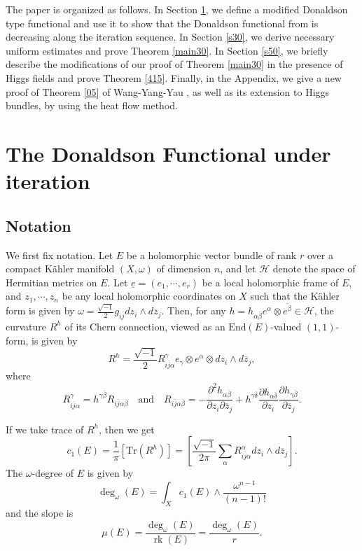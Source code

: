 \documentclass[11pt]{amsart}
\numberwithin{equation}{section}
\theoremstyle{remark}
\renewcommand{\bar}{\overline}
\newcommand{\pa}{\partial}
\newcommand{\ka}{K\"ahler }
\newcommand{\lb}{\left (}
\newcommand{\rb}{\right )}
\newcommand{\lsb}{\left [}
\newcommand{\rsb}{\right ]}
\newcommand{\ga}{\alpha}
\newcommand{\ii}{\sqrt{-1}}
\newcommand{\tr}{\text{Tr}}
\newcommand{\ud}{\underline}
\newcommand{\End}{\text{End}}
\begin{document}
The paper is organized as follows. In Section \ref{s20}, we define a modified Donaldson type functional and use it to show that the Donaldson functional from \cite{sd1} is decreasing along the iteration sequence. In Section \ref{s30}, we derive necessary uniform estimates and prove Theorem \ref{main30}. In Section \ref{s50}, we briefly describe the modifications of our proof of Theorem \ref{main30} in the presence of Higgs fields and prove Theorem \ref{415}. Finally, in the Appendix,  we give a new proof of Theorem \ref{05} of Wang-Yang-Yau \cite{WYY3}, as well as its extension to Higgs bundles, by using the heat flow method.



\section{The Donaldson Functional under iteration}\label{s20}

\subsection{Notation}
We first fix notation. Let $E$ be a holomorphic vector bundle of rank $r$ over a compact \ka manifold $(X,\omega)$ of dimension $n$, and let $\mathcal H$ denote the space of Hermitian metrics on $E$.  Let $\ud{e}=\lb e_1,\cdots,e_r\rb$ be a local holomorphic frame of $E$, and $z_1,\cdots,z_n$ be any local holomorphic coordinates on $X$ such that the \ka form is given by $\omega=\frac{\ii}{2}g_{i\bar j}dz_i\wedge d\bar z_j$.
Then, for any $h=h_{\alpha\bar{\beta}}e^\alpha\otimes \bar{e^{\beta}}\in\mathcal H$, the curvature $R^h$ of its Chern connection, viewed as an $\End(E)$-valued $(1,1)$-form, is given by
\[
R^h=\frac{\ii}{2}R_{i\bar j\alpha}^\gamma e_\gamma\otimes e^\alpha\otimes dz_i\wedge d\bar z_j,
\]
where
\[ R_{i\bar j\alpha}^\gamma = h^{\gamma\bar\beta}R_{i\bar j\alpha\bar\beta} \quad \text{and} \quad  R_{i\bar j\alpha\bar\beta}=-\frac{\pa^2 h_{\alpha\bar\beta}}{\pa z_i\pa\bar z_j}+ h^{\gamma\bar\delta}\frac{\pa h_{\alpha\bar\delta}}{\pa z_i}\frac{\pa h_{\gamma\bar\beta}}{\pa\bar z_j}.
\]


If we take trace of $R^h$, then  we get
\[
c_1(E)=\frac{1}{\pi}\lsb \tr\lb R^h\rb\rsb=\lsb \frac{\ii}{2\pi}\sum_\ga R_{i\bar j\ga}^\ga dz_i\wedge d\bar z_j\rsb.
\]
The $\omega$-degree of $E$ is given by
\[
\deg_\omega(E)=\int_X c_1(E)\wedge\frac{\omega^{n-1}}{(n-1)!}
\]
and the slope is
\[
\mu(E)=\frac{\deg_\omega(E)}{\operatorname{rk}(E)} =\frac{\deg_\omega(E)}{r}.\]
\end{document}
